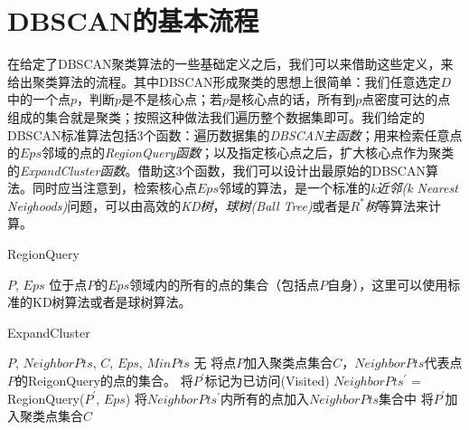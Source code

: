 \documentclass[UTF8, 12pt]{ctexart}
\begin{document}
\section{DBSCAN的基本流程}
在给定了DBSCAN聚类算法的一些基础定义之后，我们可以来借助这些定义，来给出聚类算法的流程。其中DBSCAN形成聚类的思想上很简单：我们任意选定$D$中的一个点$p$，判断$p$是不是核心点；若$p$是核心点的话，所有到$p$点密度可达的点组成的集合就是聚类；按照这种做法我们遍历整个数据集即可。我们给定的DBSCAN标准算法包括3个函数：遍历数据集的\emph{DBSCAN主函数}；用来检索任意点的$Eps$邻域的点的\emph{RegionQuery函数}；以及指定核心点之后，扩大核心点作为聚类的\emph{ExpandCluster函数}。借助这3个函数，我们可以设计出最原始的DBSCAN算法。同时应当注意到，检索核心点$Eps$邻域的算法，是一个标准的\emph{k近邻(k Nearest Neighoods)}问题，可以由高效的\emph{KD树}，\emph{球树(Ball Tree)}或者是\emph{$R^{*}$树}等算法来计算。

\begin{algorithm}[H]
	\caption{RegionQuery}
	\label{alg1}
	\begin{algorithmic}[1]
		\REQUIRE $P$, $Eps$
		\ENSURE 位于点$P$的$Eps$领域内的所有的点的集合（包括点$P$自身），这里可以使用标准的KD树算法或者是球树算法。
	\end{algorithmic}
\end{algorithm}

\begin{algorithm}[H]
	\caption{ExpandCluster}
	\label{alg2}
	\begin{algorithmic}[1]
		\REQUIRE $P$, $NeighborPts$, $C$, $Eps$, $MinPts$
		\ENSURE 无
		\STATE 将点$P$加入聚类点集合$C$，$NeighborPts$代表点$P$的ReigonQuery的点的集合。
		\STATE 将$P^{'}$标记为已访问(Visited)
		\STATE $NeighborPts^{'}$ = RegionQuery($P^{'}$, $Eps$)
		\STATE 将$NeighborPts^{'}$内所有的点加入$NeighborPts$集合中
		\ENDIF
		\ENDIF
		\STATE 将$P^{'}$加入聚类点集合$C$
		\ENDIF
		\ENDFOR
	\end{algorithmic}
\end{algorithm}
\end{document}
